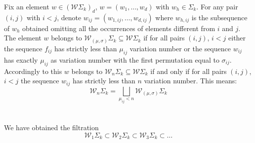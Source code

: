 	\begin{definition}
	Fix an element  $w\in (\mathcal{W}\Sigma_k)_{d}$, $w=(w_{1},\dots , w_{d})$ with $w_{h}\in \Sigma_k$. For any pair $(i,j)$ with $i< j$, denote $w_{ij}=(w_{1,ij},\dots , w_{d,ij})$ where $w_{h,ij}$ is the subsequence of $w_{h}$ obtained omitting all the occurrences of elements different from $i$ and $j$. 
	The element $w$ belongs to $\mathcal{W}_{(\mu,\sigma)}\Sigma_k\subseteq \mathcal{W}\Sigma_k$ if for all pairs $(i,j)$, $i< j$ either the sequence $f_{ij}$ has strictly less than $\mu_{ij}$ variation number
	 or the sequence $w_{ij}$ has exactly $\mu_{ij}$ as variation number with the first permutation equal to $\sigma_{ij}$. Accordingly to this $w$ belongs to $\mathcal{W}_{n}\Sigma_k\subseteq \mathcal{W}\Sigma_k$ if and only if for all pairs $(i,j)$, $i< j$ the sequence $w_{ij}$ has strictly less than $n$ variation number. This means:
	  \begin{equation*}
	 	\label{def}
	 	\mathcal{W}_{n}\Sigma_k=\bigsqcup_{\mu_{ij}< n} \mathcal{W}_{(\mu,\sigma)}\Sigma_{k}
	 \end{equation*}
	\\
	\\
	We have obtained the filtration $$\mathcal{W}_1\Sigma_k \subset \mathcal{W}_2 \Sigma_k
	\subset \mathcal{W}_3 \Sigma_k
	\subset \dots $$ 
	
\end{definition}
 
